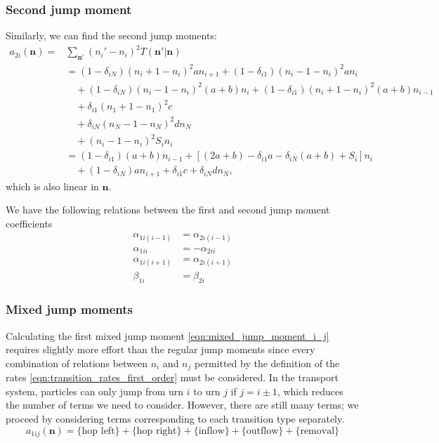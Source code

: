 \documentclass[a4paper,11pt]{report}
\numberwithin{equation}{section}
\newcommand{\V}[1]{\mathbf{#1}}
\begin{document}
\subsubsection{Second jump moment}
Similarly, we can find the second jump moments:
\begin{equation}
    \begin{aligned}
        a_{2i}(\V{n}) =& \sum_{\V{n}'} (n_i' - n_i)^2 T(\V{n}' | \V{n})\\
        &= (1-\delta_{iN})(n_i + 1 - n_i)^2a n_{i+1}
        +  (1-\delta_{i1})(n_i - 1 - n_i)^2a n_i\\
        &\quad+ (1-\delta_{iN})(n_i - 1 - n_i)^2(a+b) n_i
        +  (1-\delta_{i1})(n_i + 1 - n_i)^2(a+b) n_{i-1}\\
        &\quad+ \delta_{i1}(n_1 + 1 - n_1)^2 c\\
        &\quad+ \delta_{iN}(n_N - 1 - n_N)^2 d n_N\\
        &\quad+ (n_i - 1 - n_i)^2 S_i n_i\\
        &= (1-\delta_{i1})(a+b)n_{i-1} + \left[(2a+b) - \delta_{i1}a -
        \delta_{iN}(a+b) + S_i\right]n_i\\
        &\quad+ (1-\delta_{iN})an_{i+1} + \delta_{i1}c + \delta_{iN}d n_N,
    \end{aligned}
    \label{eqn:second_jump_mom_first_order}
\end{equation}
which is also linear in \(\V{n}\).

We have the following relations between the first and second jump moment
coefficients
\begin{align*}
    \alpha_{1i(i-1)} &= \alpha_{2i(i-1)}\\
    \alpha_{1ii} &= -\alpha_{2ii}\\
    \alpha_{1i(i+1)} &= \alpha_{2i(i+1)}\\
    \beta_{1i} &= \beta_{2i}
\end{align*}

\subsubsection{Mixed jump moments}
Calculating the first mixed jump moment \eqref{eqn:mixed_jump_moment_i_j}
requires slightly more effort than the regular jump moments since every
combination of relations between \(n_i\) and \(n_j\) permitted by the definition
of the rates \eqref{eqn:transition_rates_first_order} must be considered. In the
transport system, particles can only jump from urn \(i\) to urn \(j\) if \(j = i
\pm 1\), which reduces the number of terms we need to consider. However, there
are still many terms; we proceed by considering terms corresponding to each
transition type separately.
\begin{equation}
    a_{1ij}(\V{n}) = \{\text{hop left}\} + \{\text{hop right}\} +
    \{\text{inflow}\} + \{\text{outflow}\} + \{\text{removal}\}
\end{equation}
\end{document}
